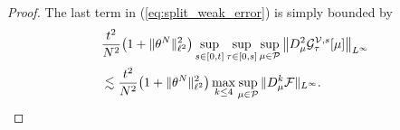 \begin{proof}
The last term in (\ref{eq:split_weak_error}) is simply bounded by 
\begin{align*}
   & \frac{t^2}{N^2}\big(1 + \|\theta^N\|^2_{\ell^2}\big)\sup_{s \in [0,t]}\sup_{\tau \in [0,s]}\sup_{\mu \in \mathcal{P}} \big\|D^2_{\mu}\mathcal{G}_{\tau}^{\mathcal{V},s}[\mu]\big\|_{L^{\infty}} \\
    & \lesssim \frac{t^2}{N^2}\big(1 + \|\theta^N\|^2_{\ell^2}\big) \max_{k \leq 4} \sup_{\mu \in \mathcal P} \|D^k_{\mu}\mathcal{F}\|_{L^\infty}.
\end{align*}


\end{proof}
